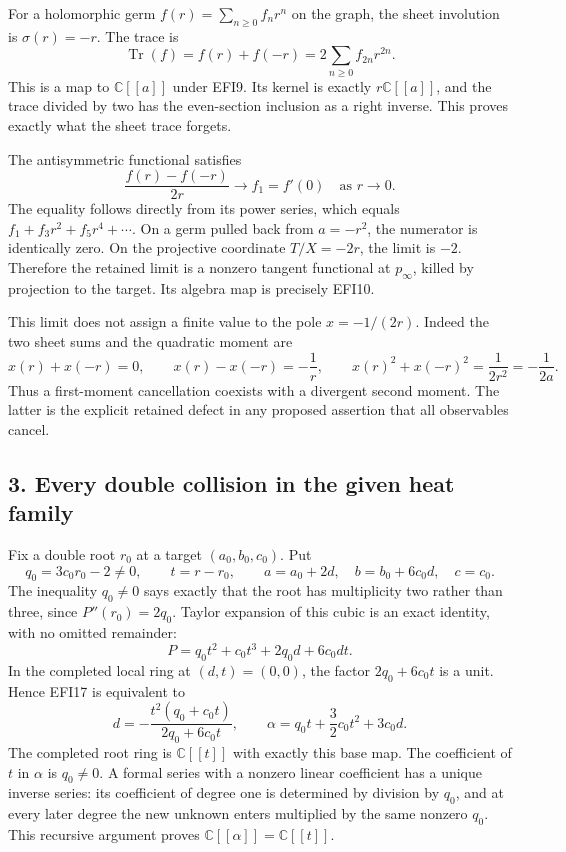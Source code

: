 \documentclass[
  10pt,
  a4paper,
]{article}
\begin{document}
For a holomorphic germ \(f(r)=\sum_{n\ge0}f_nr^n\) on the graph, the
sheet involution is \(\sigma(r)=-r\). The trace is \[
\operatorname{Tr}(f)=f(r)+f(-r)=2\sum_{n\ge0}f_{2n}r^{2n}.
\tag{EFI13}
\] This is a map to \(\mathbb C[[a]]\) under EFI9. Its kernel is exactly
\(r\mathbb C[[a]]\), and the trace divided by two has the even-section
inclusion as a right inverse. This proves exactly what the sheet trace
forgets.

The antisymmetric functional satisfies \[
\frac{f(r)-f(-r)}{2r}\longrightarrow f_1=f'(0)
\quad\text{as }r\longrightarrow0.
\tag{EFI14}
\] The equality follows directly from its power series, which equals
\(f_1+f_3r^2+f_5r^4+\cdots\). On a germ pulled back from \(a=-r^2\), the
numerator is identically zero. On the projective coordinate \(T/X=-2r\),
the limit is \(-2\). Therefore the retained limit is a nonzero tangent
functional at \(p_\infty\), killed by projection to the target. Its
algebra map is precisely EFI10.

This limit does not assign a finite value to the pole \(x=-1/(2r)\).
Indeed the two sheet sums and the quadratic moment are \[
x(r)+x(-r)=0,
\qquad x(r)-x(-r)=-\frac1r,
\qquad x(r)^2+x(-r)^2=\frac1{2r^2}=-\frac1{2a}.
\tag{EFI15}
\] Thus a first-moment cancellation coexists with a divergent second
moment. The latter is the explicit retained defect in any proposed
assertion that all observables cancel.

\subsection{3. Every double collision in the given heat
family}\label{every-double-collision-in-the-given-heat-family}

Fix a double root \(r_0\) at a target \((a_0,b_0,c_0)\). Put \[
q_0=3c_0r_0-2\ne0,\qquad t=r-r_0,
\qquad a=a_0+2d,\quad b=b_0+6c_0d,\quad c=c_0.
\tag{EFI16}
\] The inequality \(q_0\ne0\) says exactly that the root has
multiplicity two rather than three, since \(P''(r_0)=2q_0\). Taylor
expansion of this cubic is an exact identity, with no omitted remainder:
\[
P=q_0t^2+c_0t^3+2q_0d+6c_0dt.
\tag{EFI17}
\] In the completed local ring at \((d,t)=(0,0)\), the factor
\(2q_0+6c_0t\) is a unit. Hence EFI17 is equivalent to \[
d=-\frac{t^2(q_0+c_0t)}{2q_0+6c_0t},
\qquad
\alpha=q_0t+\frac32c_0t^2+3c_0d.
\tag{EFI18}
\] The completed root ring is \(\mathbb C[[t]]\) with exactly this base
map. The coefficient of \(t\) in \(\alpha\) is \(q_0\ne0\). A formal
series with a nonzero linear coefficient has a unique inverse series:
its coefficient of degree one is determined by division by \(q_0\), and
at every later degree the new unknown enters multiplied by the same
nonzero \(q_0\). This recursive argument proves
\(\mathbb C[[\alpha]]=\mathbb C[[t]]\).
\end{document}
